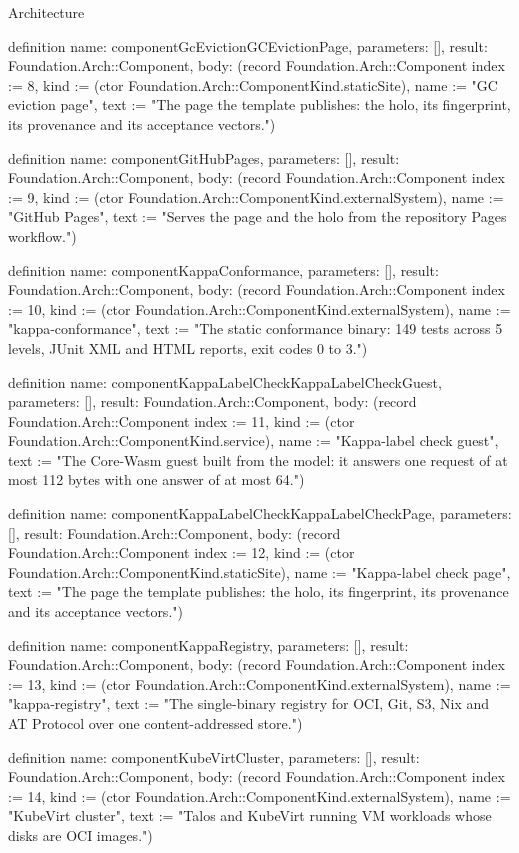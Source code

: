\begin{lexlean}{Architecture}
\begin{semanticmodule}
definition{
  name: componentGcEvictionGCEvictionPage,
  parameters: [],
  result: Foundation.Arch::Component,
  body: (record Foundation.Arch::Component {index := 8, kind := (ctor Foundation.Arch::ComponentKind.staticSite), name := "GC eviction page", text := "The page the template publishes: the holo, its fingerprint, its provenance and its acceptance vectors."})
}

definition{
  name: componentGitHubPages,
  parameters: [],
  result: Foundation.Arch::Component,
  body: (record Foundation.Arch::Component {index := 9, kind := (ctor Foundation.Arch::ComponentKind.externalSystem), name := "GitHub Pages", text := "Serves the page and the holo from the repository Pages workflow."})
}

definition{
  name: componentKappaConformance,
  parameters: [],
  result: Foundation.Arch::Component,
  body: (record Foundation.Arch::Component {index := 10, kind := (ctor Foundation.Arch::ComponentKind.externalSystem), name := "kappa-conformance", text := "The static conformance binary: 149 tests across 5 levels, JUnit XML and HTML reports, exit codes 0 to 3."})
}

definition{
  name: componentKappaLabelCheckKappaLabelCheckGuest,
  parameters: [],
  result: Foundation.Arch::Component,
  body: (record Foundation.Arch::Component {index := 11, kind := (ctor Foundation.Arch::ComponentKind.service), name := "Kappa-label check guest", text := "The Core-Wasm guest built from the model: it answers one request of at most 112 bytes with one answer of at most 64."})
}

definition{
  name: componentKappaLabelCheckKappaLabelCheckPage,
  parameters: [],
  result: Foundation.Arch::Component,
  body: (record Foundation.Arch::Component {index := 12, kind := (ctor Foundation.Arch::ComponentKind.staticSite), name := "Kappa-label check page", text := "The page the template publishes: the holo, its fingerprint, its provenance and its acceptance vectors."})
}

definition{
  name: componentKappaRegistry,
  parameters: [],
  result: Foundation.Arch::Component,
  body: (record Foundation.Arch::Component {index := 13, kind := (ctor Foundation.Arch::ComponentKind.externalSystem), name := "kappa-registry", text := "The single-binary registry for OCI, Git, S3, Nix and AT Protocol over one content-addressed store."})
}

definition{
  name: componentKubeVirtCluster,
  parameters: [],
  result: Foundation.Arch::Component,
  body: (record Foundation.Arch::Component {index := 14, kind := (ctor Foundation.Arch::ComponentKind.externalSystem), name := "KubeVirt cluster", text := "Talos and KubeVirt running VM workloads whose disks are OCI images."})
}


\end{semanticmodule}
\end{lexlean}
